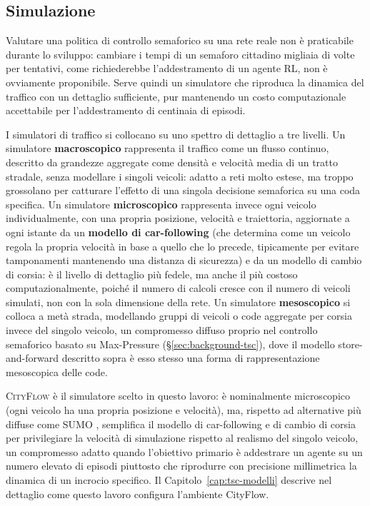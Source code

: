 \subsection{Simulazione}

Valutare una politica di controllo semaforico su una rete reale non è
praticabile durante lo sviluppo: cambiare i tempi di un semaforo cittadino
migliaia di volte per tentativi, come richiederebbe l'addestramento di un
agente RL, non è ovviamente proponibile. Serve quindi un simulatore che
riproduca la dinamica del traffico con un dettaglio sufficiente, pur
mantenendo un costo computazionale accettabile per l'addestramento di
centinaia di episodi.

I simulatori di traffico si collocano su uno spettro di dettaglio a tre
livelli. Un simulatore \textbf{macroscopico} rappresenta il traffico come
un flusso continuo, descritto da grandezze aggregate come densità e
velocità media di un tratto stradale, senza modellare i singoli veicoli:
adatto a reti molto estese, ma troppo grossolano per catturare l'effetto di
una singola decisione semaforica su una coda specifica. Un simulatore
\textbf{microscopico} rappresenta invece ogni veicolo individualmente, con
una propria posizione, velocità e traiettoria, aggiornate a ogni istante da
un \textbf{modello di car-following} (che determina come un veicolo regola
la propria velocità in base a quello che lo precede, tipicamente per
evitare tamponamenti mantenendo una distanza di sicurezza) e da un modello
di cambio di corsia: è il livello di dettaglio più fedele, ma anche il più
costoso computazionalmente, poiché il numero di calcoli cresce con il
numero di veicoli simulati, non con la sola dimensione della rete. Un
simulatore \textbf{mesoscopico} si colloca a metà strada, modellando
gruppi di veicoli o code aggregate per corsia invece del singolo veicolo,
un compromesso diffuso proprio nel controllo semaforico basato su
Max-Pressure (§\ref{sec:background-tsc}), dove il modello store-and-forward
descritto sopra è esso stesso una forma di rappresentazione mesoscopica
delle code.

\textsc{CityFlow} \citep{zhang2019cityflow} è il
simulatore scelto in questo lavoro: è nominalmente microscopico (ogni
veicolo ha una propria posizione e velocità), ma, rispetto ad alternative
più diffuse come SUMO \citep{lopez2018sumo}, semplifica il modello di
car-following e di cambio di corsia per privilegiare la velocità di
simulazione rispetto al realismo del singolo veicolo, un compromesso
adatto quando l'obiettivo primario è addestrare un agente su un numero
elevato di episodi piuttosto che riprodurre con precisione millimetrica la
dinamica di un incrocio specifico. Il Capitolo~\ref{cap:tsc-modelli}
descrive nel dettaglio come questo lavoro configura l'ambiente CityFlow.


